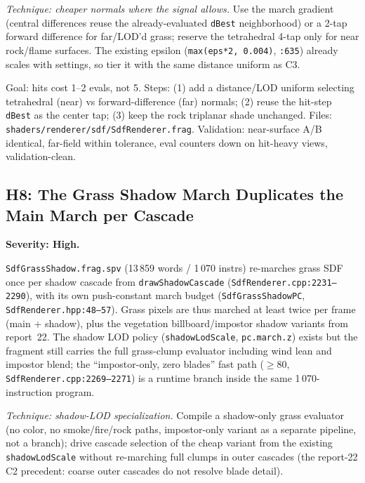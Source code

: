 \documentclass[11pt,a4paper]{article}
\begin{document}
\textit{Technique: cheaper normals where the signal allows.} Use the march
gradient (central differences reuse the already-evaluated \texttt{dBest}
neighborhood) or a 2-tap forward difference for far/LOD'd grass; reserve the
tetrahedral 4-tap only for near rock/flame surfaces. The existing epsilon
(\texttt{max(eps*2, 0.004)}, \texttt{:635}) already scales with settings, so
tier it with the same distance uniform as C3.

\begin{tcolorbox}[promptbox={Prompt --- H7: tiered normal reconstruction}]
Goal: hits cost 1--2 evals, not 5. Steps: (1) add a distance/LOD uniform
selecting tetrahedral (near) vs forward-difference (far) normals; (2) reuse
the hit-step \texttt{dBest} as the center tap; (3) keep the rock triplanar
shade unchanged. Files:
\texttt{shaders/renderer/sdf/SdfRenderer.frag}. Validation: near-surface A/B
identical, far-field within tolerance, eval counters down on hit-heavy views,
validation-clean.
\end{tcolorbox}

\subsection{H8: The Grass Shadow March Duplicates the Main March per Cascade}

\textbf{Severity: High.}

\texttt{SdfGrassShadow.frag.spv} (13\,859 words / 1\,070 instrs) re-marches
grass SDF once per shadow cascade from \texttt{drawShadowCascade}
(\texttt{SdfRenderer.cpp:2231--2290}), with its own push-constant march
budget (\texttt{SdfGrassShadowPC}, \texttt{SdfRenderer.hpp:48--57}). Grass
pixels are thus marched at least twice per frame (main + shadow), plus the
vegetation billboard/impostor shadow variants from report~22. The shadow LOD
policy (\texttt{shadowLodScale}, \texttt{pc.march.z}) exists but the fragment
still carries the full grass-clump evaluator including wind lean and impostor
blend; the ``impostor-only, zero blades'' fast path ($\ge 80$,
\texttt{SdfRenderer.cpp:2269--2271}) is a runtime branch inside the same
1\,070-instruction program.

\textit{Technique: shadow-LOD specialization.} Compile a shadow-only grass
evaluator (no color, no smoke/fire/rock paths, impostor-only variant as a
separate pipeline, not a branch); drive cascade selection of the cheap
variant from the existing \texttt{shadowLodScale} without re-marching full
clumps in outer cascades (the report-22 C2 precedent: coarse outer cascades
do not resolve blade detail).
\end{document}
